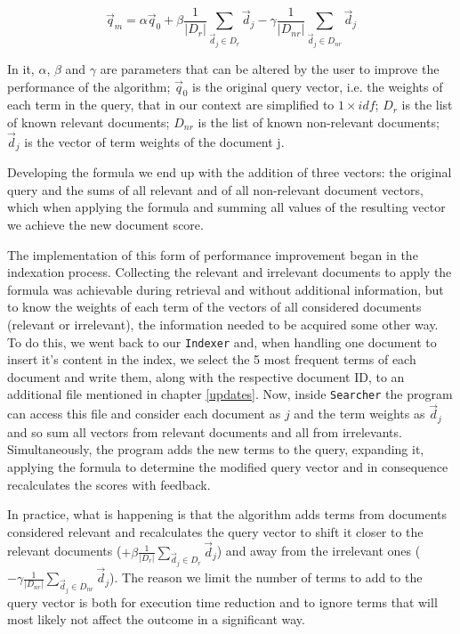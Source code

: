 \documentclass[12pt]{article}
\begin{document}
\vspace{-10pt}
\begin{equation}
  \vec{q}_{m} = \alpha\vec{q}_{0} + \beta\frac{1}{|D_{r}|} \sum_{ \vec{d}_{j} \in D_{r}} \vec{d}_{j} - \gamma\frac{1}{|D_{nr}|} \sum_{ \vec{d}_{j} \in D_{nr}} \vec{d}_{j}
\end{equation}
 
In it, $\alpha$, $\beta$ and $\gamma$ are parameters that can be altered by the 
user to improve the performance of the algorithm;
$\vec{q}_{0}$ is the original query vector, i.e. the weights of each term 
in the query, that in our context are simplified to $1 \times idf$; 
$D_{r}$ is the list of known relevant documents;
$D_{nr}$ is the list of known non-relevant documents; 
$\vec{d}_{j}$ is the vector of term weights of the document j.

Developing the formula we end up with the addition of three vectors: 
the original query and the sums of all relevant and of all non-relevant document 
vectors, which when applying the formula and summing all values of the resulting 
vector we achieve the new document score.

\newpage
The implementation of this form of performance improvement began in the indexation
process.
Collecting the relevant and irrelevant documents to apply the formula was achievable
during retrieval and without additional information, but to know the weights of
each term of the vectors of all considered documents (relevant or irrelevant), 
the information needed to be acquired some other way.
To do this, we went back to our \texttt{Indexer} and, when handling one document to insert it's content in the index, we select the 5 most frequent terms of each document and write 
them, along with the respective document ID, to an additional file mentioned in
chapter \ref{updates}.
Now, inside \texttt{Searcher} the program can access this file and consider each
document as $j$ and the term weights as $\vec{d}_{j}$ and so sum all vectors from 
relevant documents and all from irrelevants. 
Simultaneously, the program adds the new terms to the query, expanding it, 
applying the formula to determine the modified query vector and in consequence
recalculates the scores with feedback.

In practice, what is happening is that the algorithm adds terms from documents 
considered relevant and recalculates the query vector to shift it closer to 
the relevant documents ($+ \beta \frac{1}{|D_{r}|} \sum_{ \vec{d}_{j} \in D_{r}} \vec{d}_{j}$)
and away from the irrelevant ones ($- \gamma \frac{1}{|D_{nr}|} \sum_{ \vec{d}_{j} \in D_{nr}} \vec{d}_{j}$).
The reason we limit the number of terms to add to the query vector is both for 
execution time reduction and to ignore terms that will most likely not affect the 
outcome in a significant way.
\end{document}
